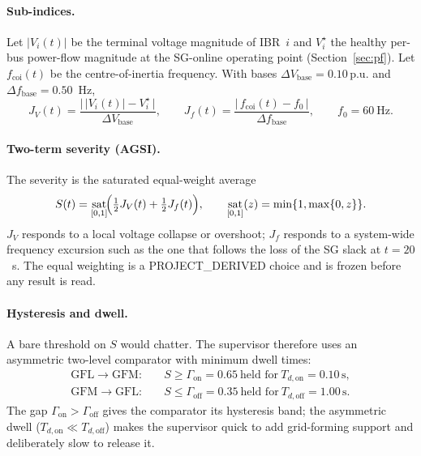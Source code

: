 \documentclass[12pt,a4paper]{article}
\theoremstyle{remark}
\DeclareMathOperator{\sat}{sat}
\newcommand{\pu}{\,\mathrm{p.u.}}
\newcommand{\second}{\,\mathrm{s}}
\begin{document}
\paragraph{Sub-indices.}
Let $|V_i(t)|$ be the terminal voltage magnitude of IBR~$i$ and $V_i^{\star}$ the
healthy per-bus power-flow magnitude at the SG-online operating point
(Section~\ref{sec:pf}). Let $f_{\mathrm{coi}}(t)$ be the centre-of-inertia
frequency. With bases $\Delta V_{\mathrm{base}}=0.10\pu$ and
$\Delta f_{\mathrm{base}}=0.50$~Hz,
\begin{equation}
  J_V(t)=\frac{\bigl|\,|V_i(t)|-V_i^{\star}\,\bigr|}{\Delta V_{\mathrm{base}}},
  \qquad
  J_f(t)=\frac{\bigl|\,f_{\mathrm{coi}}(t)-f_0\,\bigr|}{\Delta f_{\mathrm{base}}},
  \qquad f_0=60~\mathrm{Hz}.
  \label{eq:jvjf}
\end{equation}

\paragraph{Two-term severity (AGSI).}
The severity is the saturated equal-weight average
\begin{equation}
  S(t)=\sat_{[0,1]}\!\Bigl(\tfrac12 J_V(t)+\tfrac12 J_f(t)\Bigr),
  \qquad
  \sat_{[0,1]}(z)=\min\{1,\max\{0,z\}\}.
  \label{eq:agsi}
\end{equation}
$J_V$ responds to a local voltage collapse or overshoot; $J_f$ responds to a
system-wide frequency excursion such as the one that follows the loss of the SG
slack at $t=20$~s. The equal weighting is a \textsf{PROJECT\_DERIVED} choice and
is frozen before any result is read.

\paragraph{Hysteresis and dwell.}
A bare threshold on $S$ would chatter. The supervisor therefore uses an
asymmetric two-level comparator with minimum dwell times:
\begin{equation}
  \begin{aligned}
    \text{GFL}\to\text{GFM}:&\quad S\ge\Gamma_{\mathrm{on}}=0.65
       \ \text{held for}\ T_{d,\mathrm{on}}=0.10\second,\\
    \text{GFM}\to\text{GFL}:&\quad S\le\Gamma_{\mathrm{off}}=0.35
       \ \text{held for}\ T_{d,\mathrm{off}}=1.00\second.
  \end{aligned}
  \label{eq:hyst}
\end{equation}
The gap $\Gamma_{\mathrm{on}}>\Gamma_{\mathrm{off}}$ gives the comparator its
hysteresis band; the asymmetric dwell ($T_{d,\mathrm{on}}\ll T_{d,\mathrm{off}}$)
makes the supervisor quick to add grid-forming support and deliberately slow to
release it.
\end{document}
